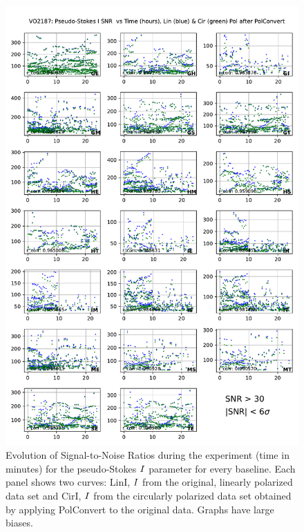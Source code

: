 \documentclass[letterpaper,twoside,12pt]{article}
\begin{document}
\begin{figure}[ht!]
  \begin{center}
  \includegraphics[width=33pc]{VO2187_SNR_Lin_I_and_Cir_I_SNR_floor_30.pdf}
  \caption{\small Evolution of Signal-to-Noise Ratios during the experiment (time in minutes) for the pseudo-Stokes $\protect I$ parameter for every baseline. Each panel shows two curves: LinI, $\protect I$ from the original, linearly polarized data set and CirI, $\protect I$ from the circularly polarized data set obtained by applying PolConvert to the original data. Graphs have large biases. }
  \label{snr_lin_and_cir}
  \end{center}
\end{figure}
\end{document}
